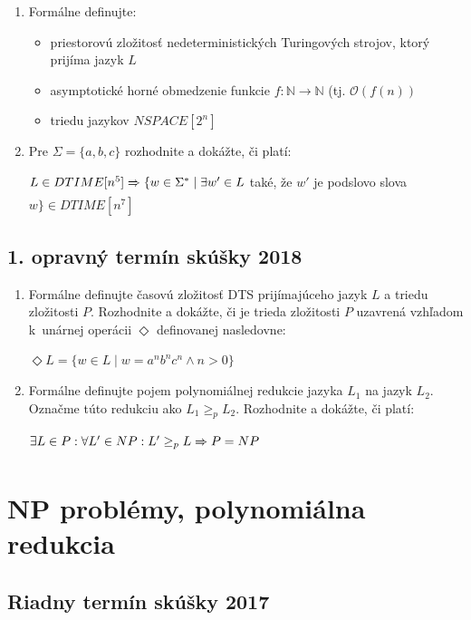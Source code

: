 \documentclass[11pt,a4paper]{article}
\begin{document}
		\begin{enumerate}
			\item Formálne definujte:

			\begin{itemize}
				\item priestorovú zložitosť nedeterministických Turingových strojov, ktorý prijíma jazyk $L$
				\item asymptotické horné obmedzenie funkcie $f: \mathbb{N} \rightarrow \mathbb{N}$ (tj. $\mathcal{O}(f(n))$
				\item triedu jazykov $NSPACE[2^n]$
			\end{itemize}

			\item Pre $\Sigma = \{a,b,c\}$ rozhodnite a dokážte, či platí:
	
			$L \in DTIME[n^5] \xRightarrow[]{} \{ w \in \Sigma^* \mid \exists w' \in L$ také, že $w'$ je podslovo slova $w\} \in DTIME[n^7]$
		\end{enumerate}	
	
		\subsection{1. opravný termín skúšky 2018}
		
		\begin{enumerate}
			\item Formálne definujte časovú zložitosť DTS prijímajúceho jazyk $L$ a triedu zložitosti $P$. Rozhodnite a dokážte, či je trieda zložitosti $P$ uzavrená vzhľadom k~unárnej operácii $\Diamond$ definovanej nasledovne:
			
			$\Diamond L = \{w \in L \mid w = a^nb^nc^n \land n > 0\}$
			
			\item Formálne definujte pojem polynomiálnej redukcie jazyka $L_1$ na jazyk $L_2$. Označme túto redukciu ako $L_1 \geq_p L_2$. Rozhodnite a dokážte, či platí:
			
			$\exists L \in P: \forall L' \in NP: L' \geq_p L \xRightarrow[]{} P = NP$
		\end{enumerate}

	\section{NP problémy, polynomiálna redukcia}

		\subsection{Riadny termín skúšky 2017}
\end{document}
